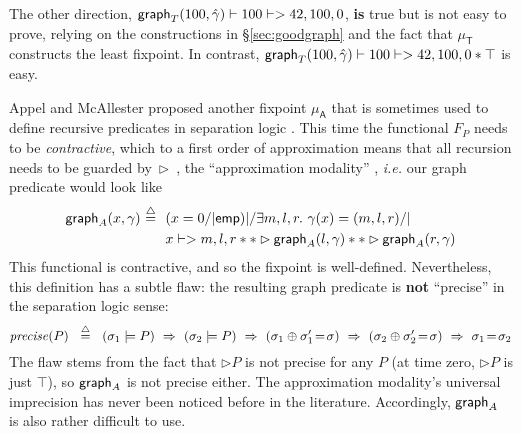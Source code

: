 The other direction, \mbox{$\mathsf{graph}_T(100,\hat{\gamma}) |- 100 |-> 42,100,0$},
\textbf{is} true but is not easy to prove, relying on the constructions in \S\ref{sec:goodgraph} and the fact that $\mu_{\mathsf{T}}$ constructs the least fixpoint.  In contrast, $\mathsf{graph}_T(100,\hat{\gamma}) |- 100 |-> 42,100,0 * \top$ is easy. %


Appel and McAllester proposed another fixpoint $\mu_{\mathsf{A}}$
that is sometimes used to define recursive predicates in separation
logic \cite{appel:fixpoint}.  This time the functional $F_P$ needs to be
\emph{contractive}, which to a first order of approximation means that
all recursion needs to be guarded by~$\rhd$~, the ``approximation
modality'' \cite{appel:vmm}, \emph{i.e.} our graph predicate would
look like
\begin{align*}
\grapham(x, \gamma) ~ \defeq ~~ &(x = 0 /| \p{emp}) |/ \exists m,l,r.~ \gamma(x)=(m,l,r) /| \null \\
 & x |-> m,l,r ** \rhd \grapham(l, \gamma) ** \rhd \grapham(r, \gamma)
\end{align*}
This functional is contractive, and so the fixpoint is well-defined.  
Nevertheless, this definition has a subtle flaw: the resulting graph
predicate is \textbf{not} ``precise'' in the separation logic sense:
\[
\mathit{precise}(P) ~~ \mathbin{\stackrel{\triangle}{=}} ~~ (\sigma_1 |= P) ~ => ~ (\sigma_2 |= P) ~ => ~ (\sigma_1 \oplus \sigma_1' \! = \! \sigma) ~ => ~ (\sigma_2 \oplus \sigma_2' \! = \! \sigma) ~ => ~ \sigma_1 \! = \! \sigma_2
\]
The flaw stems from the fact that $\rhd P$ is not precise for any $P$ 
(at time zero, $\rhd P$ is just $\top$), 
so $\mathsf{graph}_A$ is not precise either.  The approximation modality's 
universal imprecision has never been noticed before in the literature.
Accordingly, $\mathsf{graph}_A$ is also rather difficult to use.

